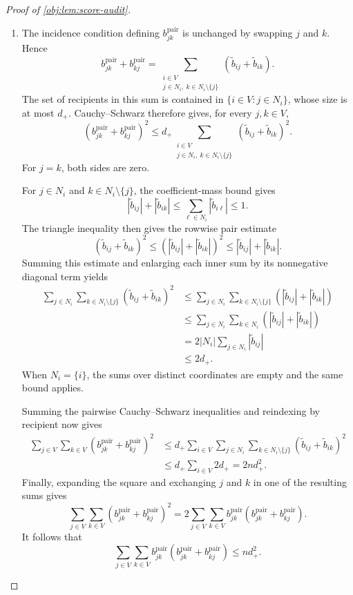 \documentclass[11pt]{article}
\begin{document}
\begin{proof}[Proof of \cref{obj:lem:score-audit}]
\begin{enumerate}
\item The incidence condition defining \(b^{\mathrm{pair}}_{jk}\) is unchanged by swapping \(j\) and \(k\). Hence
\[
b^{\mathrm{pair}}_{jk}+b^{\mathrm{pair}}_{kj}
=
\sum_{\substack{i\in V\\j\in N_i,\ k\in N_i\setminus\{j\}}}
(\widetilde b_{ij}+\widetilde b_{ik}).
\]
The set of recipients in this sum is contained in
\(\{i\in V:j\in N_i\}\), whose size is at most \(d_+\). Cauchy--Schwarz therefore gives, for every \(j,k\in V\),
\[
\left(b^{\mathrm{pair}}_{jk}+b^{\mathrm{pair}}_{kj}\right)^2
\le
d_+\sum_{\substack{i\in V\\j\in N_i,\ k\in N_i\setminus\{j\}}}
(\widetilde b_{ij}+\widetilde b_{ik})^2.
\]
For \(j=k\), both sides are zero.

For \(j\in N_i\) and \(k\in N_i\setminus\{j\}\), the coefficient-mass bound gives
\[
|\widetilde b_{ij}|+|\widetilde b_{ik}|
\le\sum_{\ell\in N_i}|\widetilde b_{i\ell}|
\le1.
\]
The triangle inequality then gives the rowwise pair estimate
\[
(\widetilde b_{ij}+\widetilde b_{ik})^2
\le
\left(|\widetilde b_{ij}|+|\widetilde b_{ik}|\right)^2
\le
|\widetilde b_{ij}|+|\widetilde b_{ik}|.
\]
Summing this estimate and enlarging each inner sum by its nonnegative diagonal term yields
\[
\begin{aligned}
\sum_{j\in N_i}\sum_{k\in N_i\setminus\{j\}}
(\widetilde b_{ij}+\widetilde b_{ik})^2
&\le
\sum_{j\in N_i}\sum_{k\in N_i\setminus\{j\}}
\left(|\widetilde b_{ij}|+|\widetilde b_{ik}|\right)\\
&\le
\sum_{j\in N_i}\sum_{k\in N_i}
\left(|\widetilde b_{ij}|+|\widetilde b_{ik}|\right)\\
&=2|N_i|\sum_{j\in N_i}|\widetilde b_{ij}|\\
&\le2d_+.
\end{aligned}
\]
When \(N_i=\{i\}\), the sums over distinct coordinates are empty and the same bound applies.

Summing the pairwise Cauchy--Schwarz inequalities and reindexing by recipient now gives
\[
\begin{aligned}
\sum_{j\in V}\sum_{k\in V}
\left(b^{\mathrm{pair}}_{jk}+b^{\mathrm{pair}}_{kj}\right)^2
&\le
d_+\sum_{i\in V}\sum_{j\in N_i}
\sum_{k\in N_i\setminus\{j\}}
(\widetilde b_{ij}+\widetilde b_{ik})^2\\
&\le d_+\sum_{i\in V}2d_+
=2nd_+^2.
\end{aligned}
\]
Finally, expanding the square and exchanging \(j\) and \(k\) in one of the resulting sums gives
\[
\sum_{j\in V}\sum_{k\in V}
\left(b^{\mathrm{pair}}_{jk}+b^{\mathrm{pair}}_{kj}\right)^2
=
2\sum_{j\in V}\sum_{k\in V}
b^{\mathrm{pair}}_{jk}
\left(b^{\mathrm{pair}}_{jk}+b^{\mathrm{pair}}_{kj}\right).
\]
It follows that
\[
\sum_{j\in V}\sum_{k\in V}
b^{\mathrm{pair}}_{jk}
\left(b^{\mathrm{pair}}_{jk}+b^{\mathrm{pair}}_{kj}\right)
\le nd_+^2.
\]


\end{enumerate}
\end{proof}
\end{document}

